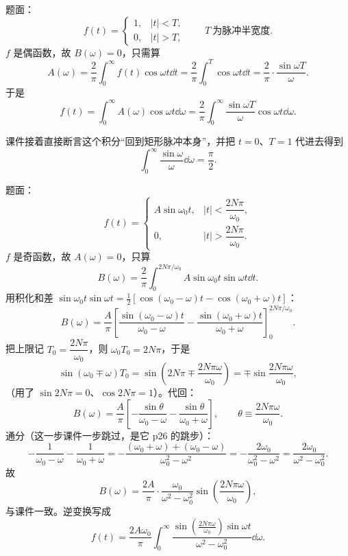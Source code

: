 \documentclass[11pt]{ctexart}
\begin{document}

题面：
\[
f(t)=\begin{cases}1, & |t|<T,\\ 0, & |t|>T,\end{cases}
\qquad T\ \text{为脉冲半宽度} .
\]
$f$ 是偶函数，故 $B(\omega)=0$，只需算
\[
A(\omega)=\frac{2}{\pi}\int_0^{\infty}f(t)\cos\omega t\dd t
=\frac{2}{\pi}\int_0^{T}\cos\omega t\dd t
=\frac{2}{\pi}\cdot\frac{\sin\omega T}{\omega} .
\]
于是
\[ f(t)=\int_0^{\infty}A(\omega)\cos\omega t\dd\omega
=\frac{2}{\pi}\int_0^{\infty}\frac{\sin\omega T}{\omega}\cos\omega t\dd\omega .\]

课件接着直接断言这个积分“回到矩形脉冲本身”，并把 $t=0$、$T=1$ 代进去得到
\[ \int_0^{\infty}\frac{\sin\omega}{\omega}\dd\omega=\frac{\pi}{2} .\]



题面：
\[
f(t)=\begin{cases}A\sin\omega_0t, & |t|<\dfrac{2N\pi}{\omega_0},\\[6pt] 0, & |t|>\dfrac{2N\pi}{\omega_0} .\end{cases}
\]
$f$ 是奇函数，故 $A(\omega)=0$，只算
\[ B(\omega)=\frac{2}{\pi}\int_0^{2N\pi/\omega_0}A\sin\omega_0t\sin\omega t\dd t .\]
用积化和差 $\sin\omega_0t\sin\omega t=\frac{1}{2}\left[\cos(\omega_0-\omega)t-\cos(\omega_0+\omega)t\right]$：
\[
B(\omega)=\frac{A}{\pi}\left[\frac{\sin(\omega_0-\omega)t}{\omega_0-\omega}-\frac{\sin(\omega_0+\omega)t}{\omega_0+\omega}\right]_{0}^{2N\pi/\omega_0} .
\]
把上限记 $T_0=\dfrac{2N\pi}{\omega_0}$，则 $\omega_0T_0=2N\pi$，于是
\[
\sin(\omega_0\mp\omega)T_0=\sin\left(2N\pi\mp\frac{2N\pi\omega}{\omega_0}\right)=\mp\sin\frac{2N\pi\omega}{\omega_0} ,
\]
（用了 $\sin2N\pi=0$、$\cos2N\pi=1$）。代回：
\[
B(\omega)=\frac{A}{\pi}\left[-\frac{\sin\theta}{\omega_0-\omega}-\frac{\sin\theta}{\omega_0+\omega}\right],
\qquad \theta\equiv\frac{2N\pi\omega}{\omega_0} .
\]
通分（这一步课件一步跳过，是它 p26 的跳步）：
\[
-\frac{1}{\omega_0-\omega}-\frac{1}{\omega_0+\omega}
=-\frac{(\omega_0+\omega)+(\omega_0-\omega)}{\omega_0^{2}-\omega^{2}}
=-\frac{2\omega_0}{\omega_0^{2}-\omega^{2}}=\frac{2\omega_0}{\omega^{2}-\omega_0^{2}} .
\]
故
\[ B(\omega)=\frac{2A}{\pi}\cdot\frac{\omega_0}{\omega^{2}-\omega_0^{2}}\sin\left(\frac{2N\pi\omega}{\omega_0}\right) ,\]
与课件一致。逆变换写成
\[ f(t)=\frac{2A\omega_0}{\pi}\int_0^{\infty}\frac{\sin\left(\frac{2N\pi\omega}{\omega_0}\right)\sin\omega t}{\omega^{2}-\omega_0^{2}}\dd\omega .\]
\end{document}
